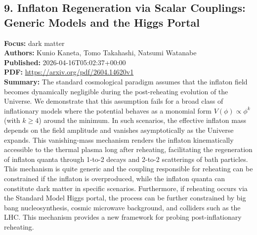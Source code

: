 \documentclass[11pt]{article}
\begin{document}
\subsection*{9. Inflaton Regeneration via Scalar Couplings: Generic Models and the Higgs Portal}
\textbf{Focus:} dark matter\\
\textbf{Authors:} Kunio Kaneta, Tomo Takahashi, Natsumi Watanabe\\
\textbf{Published:} 2026-04-16T05:02:37+00:00\\
\textbf{PDF:} \href{https://arxiv.org/pdf/2604.14620v1}{https://arxiv.org/pdf/2604.14620v1}\\
\textbf{Summary:}
The standard cosmological paradigm assumes that the inflaton field becomes dynamically negligible during the post-reheating evolution of the Universe. We demonstrate that this assumption fails for a broad class of inflationary models where the potential behaves as a monomial form $V(\phi ) \propto \phi ^k$ (with $k \ge 4$) around the minimum. In such scenarios, the effective inflaton mass depends on the field amplitude and vanishes asymptotically as the Universe expands. This vanishing-mass mechanism renders the inflaton kinematically accessible to the thermal plasma long after reheating, facilitating the regeneration of inflaton quanta through 1-to-2 decays and 2-to-2 scatterings of bath particles. This mechanism is quite generic and the coupling responsible for reheating can be constrained if the inflaton is overproduced, while the inflaton quanta can constitute dark matter in specific scenarios. Furthermore, if reheating occurs via the Standard Model Higgs portal, the process can be further constrained by big bang nucleosynthesis, cosmic microwave background, and colliders such as the LHC. This mechanism provides a new framework for probing post-inflationary reheating.
\newpage
\end{document}
